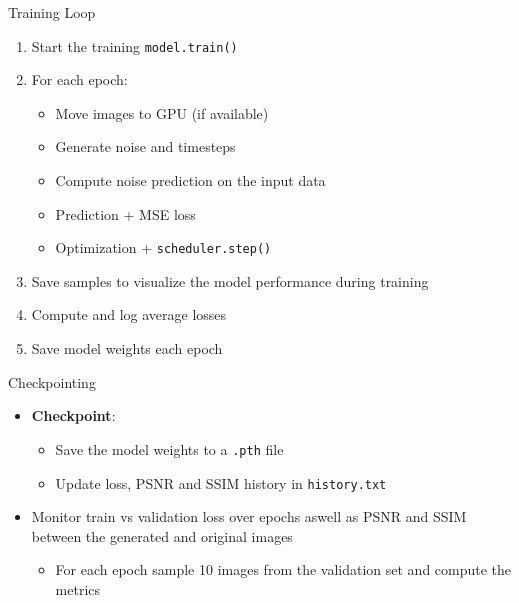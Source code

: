 \begin{frame}{Training Loop}
    \begin{enumerate}
        \item Start the training \texttt{model.train()}
        \item For each epoch:
              \begin{itemize}
                  \item Move images to GPU (if available)
                  \item Generate noise and timesteps
                  \item Compute noise prediction on the input data
                  \item Prediction + MSE loss
                  \item Optimization + \texttt{scheduler.step()}
              \end{itemize}
        \item Save samples to visualize the model performance during training
        \item Compute and log average losses
        \item Save model weights each epoch
    \end{enumerate}
\end{frame}

\begin{frame}{Checkpointing}
    \begin{itemize}
        \item \textbf{Checkpoint}:
              \begin{itemize}
                  \item Save the model weights to a \texttt{.pth} file
                  \item Update loss, PSNR and SSIM history in \texttt{history.txt}
              \end{itemize}
        \item Monitor train vs validation loss over epochs aswell as PSNR and SSIM between the generated and original images
              \begin{itemize}
                  \item For each epoch sample 10 images from the validation set and compute the metrics
              \end{itemize}
    \end{itemize}
\end{frame}


